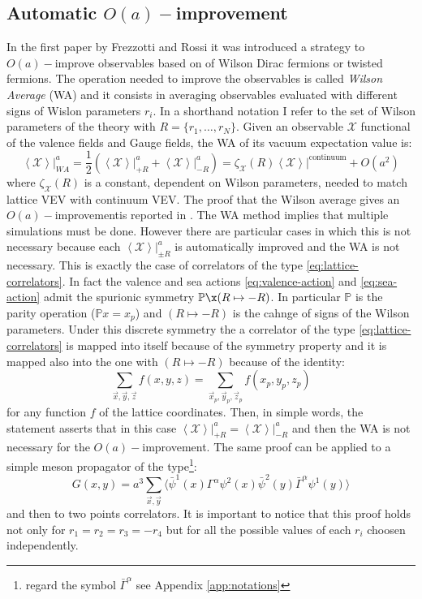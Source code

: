 \documentclass[english, LaM, oneside, noexaminfo]{sapthesis}
\newcommand{\la}{\langle}
\newcommand{\ra}{\rangle}
\newcommand{\oait}{$O(a)-$improvement}
\begin{document}
\subsection{Automatic \oait}
\noindent
In the first paper by Frezzotti and Rossi \cite{FR1} it was introduced a strategy to $O(a)-$improve observables based on of Wilson Dirac fermions or twisted fermions.
The operation needed to improve the observables is called \textit{Wilson Average} (WA) and it consists in averaging observables evaluated with different signs of Wislon parameters $r_i$.
In a shorthand notation I refer to the set of Wilson parameters of the theory with $R = \{r_1,\dots,r_N\}$.
\newline
Given an observable $\mathcal{X}$ functional of the valence fields and Gauge fields, the WA of its vacuum expectation value is:
\begin{equation*}
    \left\la \mathcal{X} \right\ra\Big|_{WA}^a = \frac{1}{2}\left( \left\la \mathcal{X} \right\ra\Big|_{+R}^a + \left\la \mathcal{X} \right\ra\Big|_{-R}^a\right) 
    = \zeta_\mathcal{X}(R)  \left\la \mathcal{X} \right\ra\Big|^\text{continuum} + O(a^2)
\end{equation*}
where $\zeta_\mathcal{X}(R)$ is a constant, dependent on Wilson parameters, needed to match lattice VEV with continuum VEV.
The proof that the Wilson average gives an \oait\space is reported in \cite{FR1}. 
\newline
The WA method implies that multiple simulations must be done.
However there are particular cases in which this is not necessary because each $\left\la \mathcal{X} \right\ra\big|_{\pm R}^a$ is automatically improved and the WA is not necessary.
This is exactly the case of correlators of the type \ref{eq:lattice-correlators}.
In fact the valence and sea actions \ref{eq:valence-action} and \ref{eq:sea-action} admit the spurionic symmetry $\mathbb{P}\x (R\mapsto -R)$.
In particular $\mathbb{P}$ is the parity operation ($\mathbb{P}x = x_p$) and $(R\mapsto -R)$ is the cahnge of signs of the Wilson parameters.
Under this discrete symmetry the a correlator of the type \ref{eq:lattice-correlators} is mapped into itself because of the symmetry property and it is mapped also into the one with $(R\mapsto -R)$ because of the identity:
\begin{equation*}
    \sum_{\vec x, \vec y, \vec z} f(x,y,z) =  \sum_{\vec x_p, \vec y_p, \vec z_p} f(x_p,y_p,z_p)
\end{equation*}
for any function $f$ of the lattice coordinates.
Then, in simple words, the statement asserts that in this case $\left\la \mathcal{X} \right\ra\big|_{+R}^a = \left\la \mathcal{X} \right\ra\big|_{-R}^a$ and then the WA is not necessary for the \oait.
The same proof can be applied to a simple meson propagator of the type\footnote{regard the symbol $\bar\Gamma^\alpha$ see Appendix \ref{app:notations}}:
\begin{equation*}
    G(x,y)=a^3\sum_{\vec x, \vec y} \Big\la \bar \psi^1 (x) \Gamma^\alpha \psi^2 (x) \bar\psi^2 (y) \bar\Gamma^\alpha \psi^1 (y) \Big\ra 
\end{equation*}
and then to two points correlators.
It is important to notice that this proof holds not only for $r_1=r_2=r_3=-r_4$ but for all the possible values of each $r_i$ choosen independently.
\end{document}
